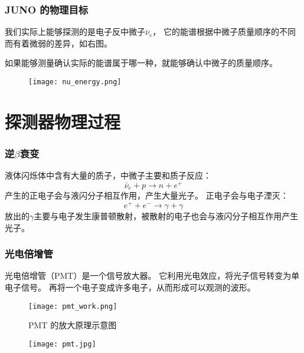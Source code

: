 \documentclass[aspectratio=149]{beamer}
\begin{document}
\begin{frame}
    \frametitle{JUNO 的物理目标}

    \begin{multicols}{2}
        我们实际上能够探测的是电子反中微子$\bar{\nu}_e$，
        它的能谱根据中微子质量顺序的不同而有着微弱的差异，如右图。

        如果能够测量确认实际的能谱属于哪一种，就能够确认中微子的质量顺序。
        \columnbreak
        \begin{figure}
            \centering
            \texttt{[image: nu\_energy.png]}
        \end{figure}
    \end{multicols}

\end{frame}
\section{探测器物理过程}
\begin{frame}
    \frametitle{逆$\beta$衰变}

    液体闪烁体中含有大量的质子，中微子主要和质子反应：
    \begin{equation*}
        \bar{\nu}_e+p\to n+e^+
    \end{equation*}
    产生的正电子会与液闪分子相互作用，产生大量光子。
    正电子会与电子湮灭：
    \begin{equation*}
        e^+ +e^-\to\gamma+\gamma
    \end{equation*}
    放出的$\gamma$主要与电子发生康普顿散射，被散射的电子也会与液闪分子相互作用产生光子。

\end{frame}

\begin{frame}
    \frametitle{光电倍增管}

    \begin{multicols}{2}
        光电倍增管（PMT）是一个信号放大器。
        它利用光电效应，将光子信号转变为单电子信号。
        再将一个电子变成许多电子，从而形成可以观测的波形。

        \begin{figure}
            \centering
            \texttt{[image: pmt\_work.png]}
            \caption{PMT 的放大原理示意图}
        \end{figure}
        \columnbreak
        \begin{figure}
            \centering
            \texttt{[image: pmt.jpg]}
        \end{figure}
    \end{multicols}

\end{frame}
\end{document}
